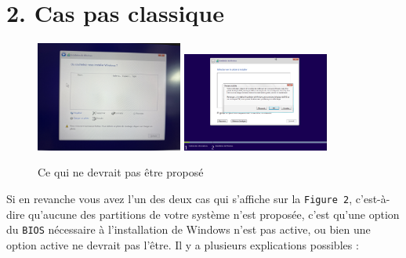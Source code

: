 \documentclass[french, a4paper, 11pt]{article}
\begin{document}
\section*{2. Cas pas classique}
\begin{figure}
  \begin{adjustwidth}{0cm}{}
    \begin{minipage}[t]{\textwidth}
      \centering
      \includegraphics[width=0.43\textwidth]{pas_disques.jpg}\hspace{2cm}
      \includegraphics[width=0.43\textwidth]{no_pilots.png}
      \caption{Ce qui ne devrait pas être proposé}
      \label{fig:disquesPasOK}
    \end{minipage}
  \end{adjustwidth}
\end{figure}
\noindent Si en revanche vous avez l'un des deux cas qui s'affiche sur la \texttt{Figure 2}, c'est-à-dire qu'aucune des partitions de votre système n'est proposée, c'est qu'une option du \texttt{BIOS} nécessaire à l'installation de Windows n'est pas active, ou bien une option active ne devrait pas l'être. Il y a plusieurs explications possibles :
\end{document}
